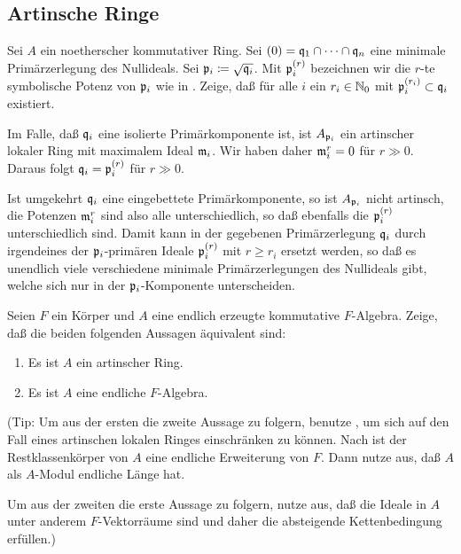 \subsection{Artinsche Ringe}

\begin{exercise}
	Sei \(A\) ein noetherscher kommutativer Ring. Sei \((0) = \mathfrak{q}_1 \cap \dotsb \cap \mathfrak{q}_n\) eine
	minimale Primärzerlegung des Nullideals. Sei \(\mathfrak{p}_i \coloneqq \sqrt{\mathfrak{q}_i}\). 
	Mit \(\mathfrak{p}_i^{(r)}\) bezeichnen wir die \(r\)-te symbolische Potenz von \(\mathfrak{p}_i\) wie in
	. Zeige, daß für alle \(i\) ein \(r_i \in \mathbb N_0\) mit
	\(\mathfrak{p}_i^{(r_i)} \subset \mathfrak{q}_i\) existiert.
	
	Im Falle, daß \(\mathfrak{q}_i\) eine isolierte Primärkomponente ist, ist \(A_{\mathfrak{p}_i}\) ein artinscher
	lokaler Ring mit maximalem Ideal \(\mathfrak{m}_i\). Wir haben daher \(\mathfrak{m}_i^r = 0\) für \(r \gg 0\).
	Daraus folgt \(\mathfrak{q}_i = \mathfrak{p}_i^{(r)}\) für \(r \gg 0\).
	
	Ist umgekehrt \(\mathfrak{q}_i\) eine eingebettete Primärkomponente, so ist \(A_{\mathfrak{p}_i}\) nicht artinsch,
	die Potenzen \(\mathfrak{m}_i^r\) sind also alle unterschiedlich, so daß ebenfalls die \(\mathfrak{p}_i^{(r)}\) unterschiedlich
	sind. Damit kann in der gegebenen Primärzerlegung \(\mathfrak{q}_i\) durch irgendeines der \(\mathfrak{p}_i\)-primären Ideale
	\(\mathfrak{p}_i^{(r)}\) mit \(r \ge r_i\) ersetzt werden, so daß es unendlich viele verschiedene
	minimale Primärzerlegungen des Nullideals gibt, welche sich nur in der \(\mathfrak{p}_i\)-Komponente
	unterscheiden.	
\end{exercise}

\begin{exercise}
	Seien \(F\) ein Körper und \(A\) eine endlich erzeugte kommutative \(F\)-Algebra. Zeige, daß die beiden
	folgenden Aussagen äquivalent sind:
	\begin{enumerate}
	\item
		Es ist \(A\) ein artinscher Ring.
	\item
		Es ist \(A\) eine endliche \(F\)-Algebra.
	\end{enumerate}
	
	(Tip: Um aus der ersten die zweite Aussage zu folgern, benutze , um sich
	auf den Fall eines artinschen lokalen Ringes einschränken zu können. Nach  ist
	der Restklassenkörper von \(A\) eine endliche Erweiterung von \(F\). Dann nutze aus, daß \(A\) als \(A\)-Modul
	endliche Länge hat.
	
	Um aus der zweiten die erste Aussage zu folgern, nutze aus, daß die Ideale in \(A\) unter anderem \(F\)-Vektorräume
	sind und daher die absteigende Kettenbedingung erfüllen.)
\end{exercise}

